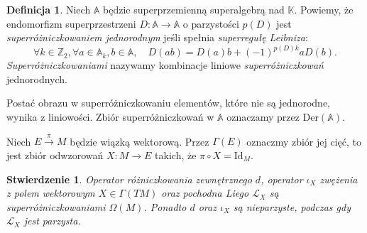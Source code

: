 \documentclass[11pt,a4paper]{report}
\newtheorem{proposition}[theorem]{Stwierdzenie}
\theoremstyle{definition}
\newtheorem{definition}[theorem]{Definicja}
\begin{document}
\begin{definition}
Niech $\mathbb{A}$ będzie superprzemienną superalgebrą nad $\mathbb{K}$. Powiemy, że endomorfizm superprzestrzeni $D: \mathbb{A} \rightarrow \mathbb{A}$ o parzystości $p(D)$ jest \textit{superróżniczkowaniem jednorodnym}  jeśli spełnia \textit{superregułę Leibniza}:
\begin{equation*}
\forall k \in \mathbb{Z}_2, \forall a \in \mathbb{A}_k, b \in \mathbb{A}, \quad D(ab) = D(a)b + (-1)^{p(D)k}aD(b).
\end{equation*}
\textit{Superróżniczkowaniami} nazywamy kombinacje liniowe \textit{superróżniczkowa\'n} jednorodnych.
\end{definition}

Postać obrazu w superróżniczkowaniu elementów, które nie są jednorodne, wynika z liniowości. Zbiór superróżniczkowań w $\mathbb{A}$ oznaczamy przez $\mathrm{Der}(\mathbb{A})$.

Niech $E \stackrel{\pi}{\longrightarrow} M$ będzie wiązką wektorową. Przez $\Gamma(E)$ oznaczmy zbiór jej cięć, to jest zbiór odwzorowań $X: M \rightarrow E$ takich, że $\pi \circ X = \mathrm{Id}_M.$

\begin{proposition} 
Operator różniczkowania zewnętrznego $d$, operator $\iota_X$ zwężenia z polem wektorowym $X \in \Gamma(TM)$ oraz pochodna Liego $\mathcal{L}_X$ są superróżniczkowaniami $\Omega(M)$. Ponadto $d$ oraz $\iota_X$ są nieparzyste, podczas gdy $\mathcal{L}_X$ jest parzysta. 
\end{proposition}
\end{document}
